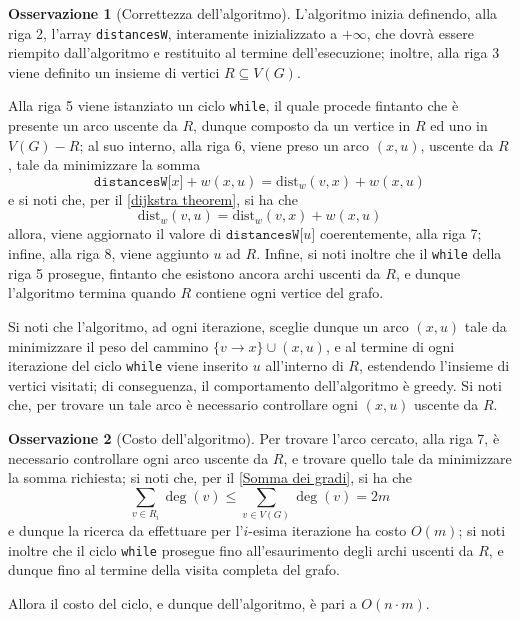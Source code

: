 \documentclass[14pt]{extreport}
\theoremstyle{definition}
\theoremstyle{definition}
\newtheorem{remark}{Osservazione}[subsection]
\begin{document}
\begin{remark}[Correttezza dell'algoritmo]
    L'algoritmo inizia definendo, alla riga 2, l'array \texttt{distancesW}, interamente inizializzato a $+ \infty$, che dovrà essere riempito dall'algoritmo e restituito al termine dell'esecuzione; inoltre, alla riga 3 viene definito un insieme di vertici $R \subseteq V(G)$.

    Alla riga 5 viene istanziato un ciclo \texttt{while}, il quale procede fintanto che è presente un arco uscente da $R$, dunque composto da un vertice in $R$ ed uno in $V(G) - R$; al suo interno, alla riga 6, viene preso un arco $(x, u)$, uscente da $R$, tale da minimizzare la somma $$\texttt{distancesW[}x\texttt{]} + w(x, u) = \mathrm{dist}_w(v, x) + w(x, u)$$ e si noti che, per il \cref{dijkstra theorem}, si ha che $$\mathrm{dist}_w(v, u) = \mathrm{dist}_w(v, x) + w(x, u)$$ allora, viene aggiornato il valore di $\texttt{distancesW[}u\texttt{]}$ coerentemente, alla riga 7; infine, alla riga 8, viene aggiunto $u$ ad $R$. Infine, si noti inoltre che il \texttt{while} della riga 5 prosegue, fintanto che esistono ancora archi uscenti da $R$, e dunque l'algoritmo termina quando $R$ contiene ogni vertice del grafo.

    Si noti che l'algoritmo, ad ogni iterazione, sceglie dunque un arco $(x, u)$ tale da minimizzare il peso del cammino $\{v \rightarrow x\} \cup (x, u)$, e al termine di ogni iterazione del ciclo \texttt{while} viene inserito $u$ all'interno di $R$, estendendo l'insieme di vertici visitati; di conseguenza, il comportamento dell'algoritmo è greedy. Si noti che, per trovare un tale arco è necessario controllare ogni $(x, u)$ uscente da $R$.
\end{remark}

\begin{remark}[Costo dell'algoritmo]
    Per trovare l'arco cercato, alla riga 7, è necessario controllare ogni arco uscente da $R$, e trovare quello tale da minimizzare la somma richiesta; si noti che, per il \cref{Somma dei gradi}, si ha che $$\displaystyle \sum_{v \in R_i}{\deg(v)} \le \sum_{v \in V(G)}{\deg(v)} = 2m$$ e dunque la ricerca da effettuare per l'$i$-esima iterazione ha costo $O(m)$; si noti inoltre che il ciclo \texttt{while} prosegue fino all'esaurimento degli archi uscenti da $R$, e dunque fino al termine della visita completa del grafo.

    Allora il costo del ciclo, e dunque dell'algoritmo, è pari a $O(n \cdot m)$.
\end{remark}
\end{document}
